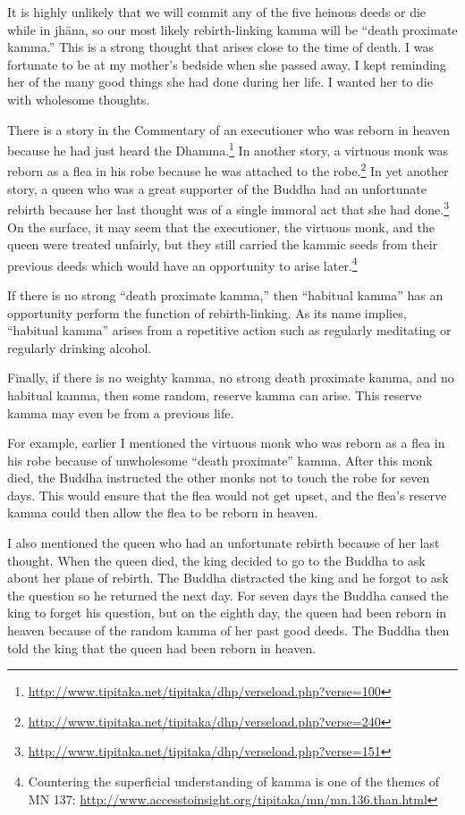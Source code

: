\pagebreak

It is highly unlikely that we will commit any of the five heinous deeds or die while in jhāna, so our most likely rebirth-linking kamma will be “death proximate kamma.” This is a strong thought that arises close to the time of death. I was fortunate to be at my mother’s bedside when she passed away. I kept reminding her of the many good things she had done during her life. I wanted her to die with wholesome thoughts. 

There is a story in the Commentary of an executioner who was reborn in heaven because he had just heard the Dhamma.\footnote{\url{http://www.tipitaka.net/tipitaka/dhp/verseload.php?verse=100}} In another story, a virtuous monk was reborn as a flea in his robe because he was attached to the robe.\footnote{\url{http://www.tipitaka.net/tipitaka/dhp/verseload.php?verse=240}} In yet another story, a queen who was a great supporter of the Buddha had an unfortunate rebirth because her last thought was of a single immoral act that she had done.\footnote{\url{http://www.tipitaka.net/tipitaka/dhp/verseload.php?verse=151}} On the surface, it may seem that the executioner, the virtuous monk, and the queen were treated unfairly, but they still carried the kammic seeds from their previous deeds which would have an opportunity to arise later.\footnote{Countering the superficial understanding of kamma is one of the themes of MN 137: \url{http://www.accesstoinsight.org/tipitaka/mn/mn.136.than.html}}

If there is no strong “death proximate kamma,” then “habitual kamma” has an opportunity perform the function of rebirth-linking. As its name implies, “habitual kamma” arises from a repetitive action such as regularly meditating or regularly drinking alcohol.

Finally, if there is no weighty kamma, no strong death proximate kamma, and no habitual kamma, then some random, reserve kamma can arise. This reserve kamma may even be from a previous life. 

For example, earlier I mentioned the virtuous monk who was reborn as a flea in his robe because of unwholesome “death proximate” kamma. After this monk died, the Buddha instructed the other monks not to touch the robe for seven days. This would ensure that the flea would not get upset, and the flea’s reserve kamma could then allow the flea to be reborn in heaven. 

I also mentioned the queen who had an unfortunate rebirth because of her last thought. When the queen died, the king decided to go to the Buddha to ask about her plane of rebirth. The Buddha distracted the king and he forgot to ask the question so he returned the next day. For seven days the Buddha caused the king to forget his question, but on the eighth day, the queen had been reborn in heaven because of the random kamma of her past good deeds. The Buddha then told the king that the queen had been reborn in heaven.

